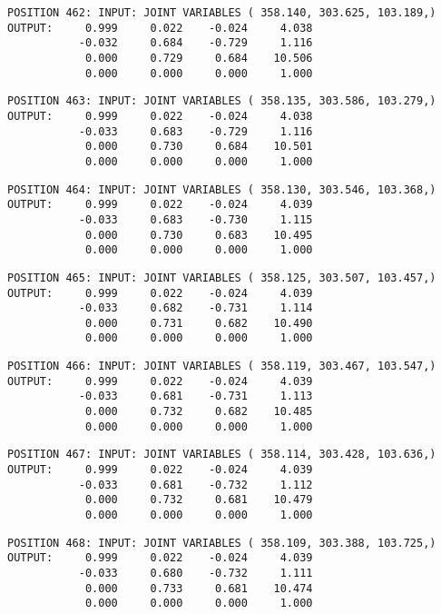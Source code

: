 \begin{verbatim}
POSITION 462: INPUT: JOINT VARIABLES ( 358.140, 303.625, 103.189,)
OUTPUT:     0.999     0.022    -0.024     4.038
           -0.032     0.684    -0.729     1.116
            0.000     0.729     0.684    10.506
            0.000     0.000     0.000     1.000
\end{verbatim} \pagebreak[1]\begin{verbatim}
POSITION 463: INPUT: JOINT VARIABLES ( 358.135, 303.586, 103.279,)
OUTPUT:     0.999     0.022    -0.024     4.038
           -0.033     0.683    -0.729     1.116
            0.000     0.730     0.684    10.501
            0.000     0.000     0.000     1.000
\end{verbatim} \pagebreak[1]\begin{verbatim}
POSITION 464: INPUT: JOINT VARIABLES ( 358.130, 303.546, 103.368,)
OUTPUT:     0.999     0.022    -0.024     4.039
           -0.033     0.683    -0.730     1.115
            0.000     0.730     0.683    10.495
            0.000     0.000     0.000     1.000
\end{verbatim} \pagebreak[1]\begin{verbatim}
POSITION 465: INPUT: JOINT VARIABLES ( 358.125, 303.507, 103.457,)
OUTPUT:     0.999     0.022    -0.024     4.039
           -0.033     0.682    -0.731     1.114
            0.000     0.731     0.682    10.490
            0.000     0.000     0.000     1.000
\end{verbatim} \pagebreak[1]\begin{verbatim}
POSITION 466: INPUT: JOINT VARIABLES ( 358.119, 303.467, 103.547,)
OUTPUT:     0.999     0.022    -0.024     4.039
           -0.033     0.681    -0.731     1.113
            0.000     0.732     0.682    10.485
            0.000     0.000     0.000     1.000
\end{verbatim} \pagebreak[1]\begin{verbatim}
POSITION 467: INPUT: JOINT VARIABLES ( 358.114, 303.428, 103.636,)
OUTPUT:     0.999     0.022    -0.024     4.039
           -0.033     0.681    -0.732     1.112
            0.000     0.732     0.681    10.479
            0.000     0.000     0.000     1.000
\end{verbatim} \pagebreak[1]\begin{verbatim}
POSITION 468: INPUT: JOINT VARIABLES ( 358.109, 303.388, 103.725,)
OUTPUT:     0.999     0.022    -0.024     4.039
           -0.033     0.680    -0.732     1.111
            0.000     0.733     0.681    10.474
            0.000     0.000     0.000     1.000
\end{verbatim} \pagebreak[1]\begin{verbatim}

\end{verbatim}

